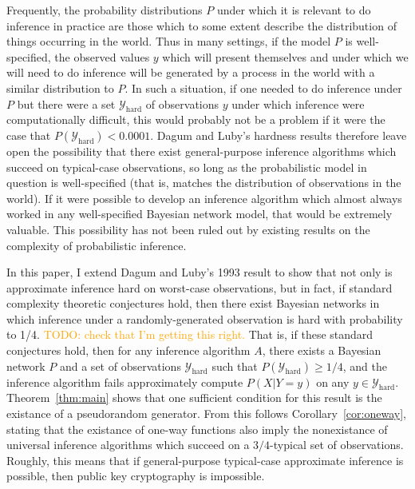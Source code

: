 \documentclass{article}
\theoremstyle{definition}
\theoremstyle{remark}
\begin{document}
Frequently, the probability distributions $P$ under which it is relevant to do inference in practice are those which to some extent describe the distribution of things occurring in the world.
Thus in many settings, if the model $P$ is well-specified, the observed values $y$ which will present themselves and under which we will need to do inference will be generated by a process in the world with a similar distribution to $P$.
In such a situation, if one needed to do inference under $P$ but there were a set $\mathcal{Y}_\text{hard}$ of observations $y$ under which inference were computationally difficult, this would probably not be a problem if it were the case that $P(\mathcal{Y}_\text{hard}) < 0.0001$.
Dagum and Luby's hardness results therefore leave open the possibility that there exist general-purpose inference algorithms which succeed on typical-case observations, so long as the probabilistic model in question is well-specified (that is, matches the distribution of observations in the world).
If it were possible to develop an inference algorithm which almost always worked in any well-specified Bayesian network model, that would be extremely valuable.
This possibility has not been ruled out by existing results on the complexity of probabilistic inference.

In this paper, I extend Dagum and Luby's 1993 result \cite{dagum1993} to show that not only is approximate inference hard on worst-case observations, but in fact, if standard complexity theoretic conjectures hold, then there exist Bayesian networks in which inference under a randomly-generated observation is hard with probability to 1/4.
\textcolor{orange}{TODO: check that I'm getting this right.}
That is, if these standard conjectures hold, then for any inference algorithm $A$, there exists a Bayesian network $P$ and a set of observations $\mathcal{Y}_\text{hard}$ such that $P(\mathcal{Y}_\text{hard}) \geq 1/4$, and the inference algorithm fails approximately compute $P(X | Y = y)$ on any $y \in \mathcal{Y}_\text{hard}$.
Theorem~\ref{thm:main} shows that one sufficient condition for this result is the existance of a pseudorandom generator.
From this follows Corollary~\ref{cor:oneway}, stating that the existance of one-way functions also imply the nonexistance of universal inference algorithms which succeed on a $3/4$-typical set of observations.
Roughly, this means that if general-purpose typical-case approximate inference is possible, then public key cryptography is impossible.
\end{document}
